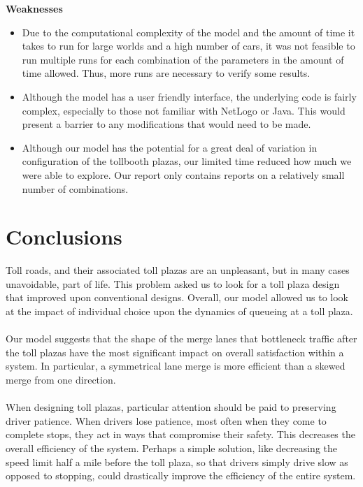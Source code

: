 \documentclass{article}
\begin{document}
\textbf{Weaknesses}
\begin{itemize}
\item Due to the computational complexity of the model and the amount of time it takes to run for large worlds and a high number of cars, it was not feasible to run multiple runs for each combination of the parameters in the amount of time allowed. Thus, more runs are necessary to verify some results.
\item Although the model has a user friendly interface, the underlying code is fairly complex, especially to those not familiar with NetLogo or Java. This would present a barrier to any modifications that would need to be made.
\item Although our model has the potential for a great deal of variation in configuration of the tollbooth plazas, our limited time reduced how much we were able to explore. Our report only contains reports on a relatively small number of combinations.
\end{itemize}

\section{Conclusions}
Toll roads, and their associated toll plazas are an unpleasant, but in many cases unavoidable, part of life. This problem asked us to look for a toll plaza design that improved upon conventional designs. Overall, our model allowed us to look at the impact of individual choice upon the dynamics of queueing at a toll plaza.\\ \\
Our model suggests that the shape of the merge lanes that bottleneck traffic after the toll plazas have the most significant impact on overall satisfaction within a system. In particular, a symmetrical lane merge is more efficient than a skewed merge from one direction.\\ \\
When designing toll plazas, particular attention should be paid to preserving driver patience. When drivers lose patience, most often when they come to complete stops, they act in ways that compromise their safety. This decreases the overall efficiency of the system. Perhaps a simple solution, like decreasing the speed limit half a mile before the toll plaza, so that drivers simply drive slow as opposed to stopping, could drastically improve the efficiency of the entire system.
\end{document}
